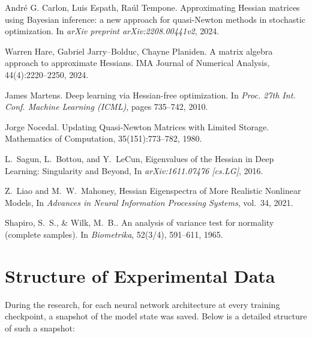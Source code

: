 \documentclass[a4paper,12pt]{article}
\begin{document}
\begin{thebibliography}{99}
  André G. Carlon, Luis Espath, Raúl Tempone.
  \newblock Approximating Hessian matrices using Bayesian inference: a new approach for quasi-Newton methods
  in stochastic optimization.
  \newblock In \emph{arXiv preprint arXiv:2208.00441v2}, 2024.

  Warren Hare, Gabriel Jarry–Bolduc, Chayne Planiden.
  \newblock A matrix algebra approach to approximate Hessians.
  \newblock IMA Journal of Numerical Analysis, 44(4):2220–2250, 2024.

  James Martens.
  \newblock Deep learning via Hessian-free optimization.
  \newblock In {\em Proc. 27th Int. Conf. Machine Learning (ICML)}, pages 735–742, 2010.

  Jorge Nocedal.
  \newblock Updating Quasi-Newton Matrices with Limited Storage.
  \newblock Mathematics of Computation, 35(151):773–782, 1980.

  L.~Sagun, L.~Bottou, and Y.~LeCun,
  \newblock Eigenvalues of the Hessian in Deep Learning: Singularity and Beyond,
  \newblock In \emph{arXiv:1611.07476 [cs.LG]}, 2016.

  Z.~Liao and M.~W.~Mahoney,
  \newblock Hessian Eigenspectra of More Realistic Nonlinear Models,
  \newblock In \emph{Advances in Neural Information Processing Systems}, vol.~34, 2021.

  Shapiro, S.~S., \& Wilk, M.~B..
  \newblock An analysis of variance test for normality (complete samples).
  \newblock In \emph{Biometrika}, 52(3/4), 591–611, 1965.

\end{thebibliography}

\newpage

\appendix
{}

\section{Structure of Experimental Data}

During the research, for each neural network architecture at every training checkpoint, a snapshot of the model state was saved. Below is a detailed structure of such a snapshot:
\end{document}
